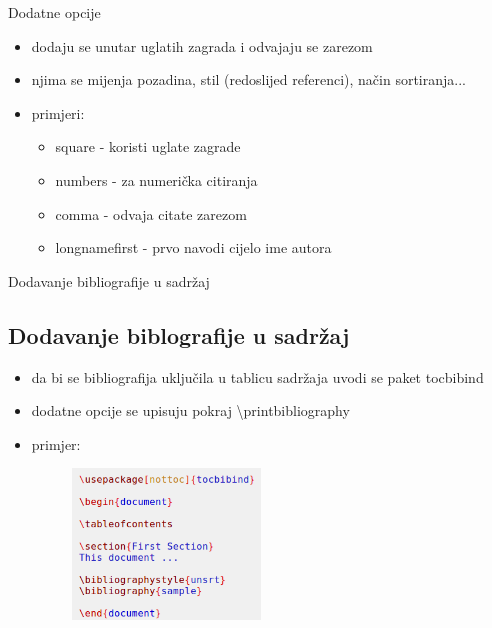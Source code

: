 \documentclass{beamer}
\begin{document}
\begin{frame}{Dodatne opcije}
\begin{itemize}
	\item dodaju se unutar uglatih zagrada i odvajaju se zarezom \\
	\item njima se mijenja pozadina, stil (redoslijed referenci), način sortiranja... \\
	\item primjeri:
	\begin{itemize}
			\item square - koristi uglate zagrade \\
			\item numbers - za numerička citiranja \\
			\item comma - odvaja citate zarezom \\
			\item longnamefirst - prvo navodi cijelo ime autora \\
	\end{itemize}
\end{itemize}
\end{frame}

\begin{frame}{Dodavanje bibliografije u sadržaj}
\subsection{Dodavanje biblografije u sadržaj}
\begin{itemize}
	\item da bi se bibliografija uključila u tablicu sadržaja uvodi se paket tocbibind \\
	\item dodatne opcije se upisuju pokraj \textbackslash printbibliography \\
	\item primjer:
	\begin{figure}
	\includegraphics[width=5cm]{natbibprimjer2.png}
	\end{figure}
\end{itemize}
\end{frame}
\end{document}
